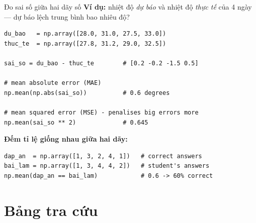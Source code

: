 \documentclass[11pt]{beamer}
\begin{document}
\begin{frame}[fragile]{Đo sai số giữa hai dãy số}
\textbf{Ví dụ:} nhiệt độ \textit{dự báo} và nhiệt độ \textit{thực tế} của 4 ngày --- dự báo lệch trung bình bao nhiêu độ?
\begin{lstlisting}
du_bao   = np.array([28.0, 31.0, 27.5, 33.0])
thuc_te  = np.array([27.8, 31.2, 29.0, 32.5])

sai_so = du_bao - thuc_te        # [0.2 -0.2 -1.5 0.5]

# mean absolute error (MAE)
np.mean(np.abs(sai_so))          # 0.6 degrees

# mean squared error (MSE) - penalises big errors more
np.mean(sai_so ** 2)             # 0.645
\end{lstlisting}
\textbf{Đếm tỉ lệ giống nhau giữa hai dãy:}
\begin{lstlisting}
dap_an  = np.array([1, 3, 2, 4, 1])   # correct answers
bai_lam = np.array([1, 3, 4, 4, 2])   # student's answers
np.mean(dap_an == bai_lam)            # 0.6 -> 60% correct
\end{lstlisting}
\end{frame}

\section{Bảng tra cứu}
\end{document}
